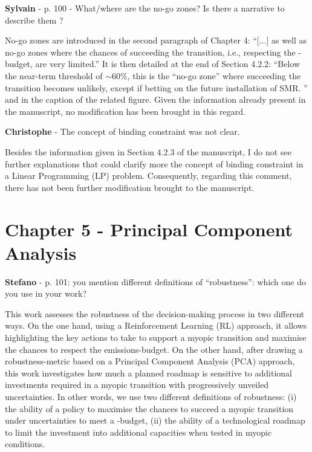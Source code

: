 \documentclass[12pt,a4paper]{article}
\begin{document}
\begin{mdframed}[style=comment] %
{\color{purple} \textbf{Sylvain}} - p. 100 - What/where are the no-go zones? Is there a narrative to describe them ?
\end{mdframed}

\noindent No-go zones are introduced in the second paragraph of Chapter 4: ``[...] as well as no-go zones where the chances of succeeding the transition, i.e., respecting the -budget, are very limited.'' It is then detailed at the end of Section 4.2.2: ``Below the near-term threshold of $\sim$60\%, this is the ``no-go zone'' where succeeding the transition becomes unlikely, except
if betting on the future installation of SMR. '' and in the caption of the related figure. Given the information already present in the manuscript, no modification has been brought in this regard.

\begin{mdframed}[style=comment] %
{\color{violet} \textbf{Christophe}} - The concept of binding constraint was not clear.
\end{mdframed}

\noindent
Besides the information given in Section 4.2.3 of the manuscript, I do not see further explanations that could clarify more the concept of binding constraint in a Linear Programming (LP) problem. Consequently, regarding this comment, there has not been further modification brought to the manuscript.

\section{Chapter 5 - Principal Component Analysis}
\label{PCA}

\begin{mdframed}[style=comment] %
{\color{orange} \textbf{Stefano}} - p. 101: you mention different definitions of ``robustness'': which one do you use in your work?
\end{mdframed}

\noindent This work assesses the robustness of the decision-making process in two different ways. On the one hand, using a Reinforcement Learning (RL) approach, it allows highlighting the key actions to take to support a myopic transition and maximise the chances to respect the emissions-budget. On the other hand, after drawing a robustness-metric based on a Principal Component Analysis (PCA) approach, this work investigates how much a planned roadmap is sensitive to additional investments required in a myopic transition with progressively unveiled uncertainties. In other words, we use two different definitions of robustness: (i) the ability of a policy to maximise the chances to succeed a myopic transition under uncertainties to meet a -budget, (ii) the ability of a technological roadmap to limit the investment into additional capacities when tested in myopic conditions. 
\end{document}
